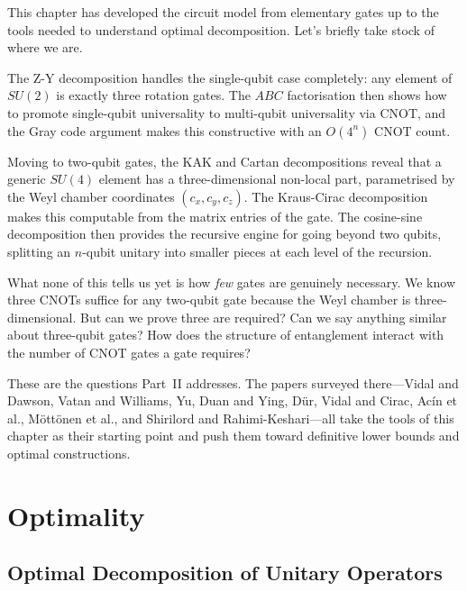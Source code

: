 \documentclass[12pt, a4paper, oneside]{report}
\theoremstyle{plain}
\theoremstyle{definition}
\theoremstyle{remark}
\begin{document}
This chapter has developed the circuit model from elementary gates up to the tools needed to
understand optimal decomposition. Let's briefly take stock of where we are.

The Z-Y decomposition handles the single-qubit case completely: any element of $SU(2)$ is
exactly three rotation gates. The $ABC$ factorisation then shows how to promote single-qubit
universality to multi-qubit universality via CNOT, and the Gray code argument makes this
constructive with an $O(4^n)$ CNOT count.

Moving to two-qubit gates, the KAK and Cartan decompositions reveal that a generic
$SU(4)$ element has a three-dimensional non-local part, parametrised by the Weyl chamber
coordinates $(c_x, c_y, c_z)$. The Kraus-Cirac decomposition makes this computable from the
matrix entries of the gate. The cosine-sine decomposition then provides the recursive engine
for going beyond two qubits, splitting an $n$-qubit unitary into smaller pieces at each
level of the recursion.

What none of this tells us yet is how \emph{few} gates are genuinely necessary. We know
three CNOTs suffice for any two-qubit gate because the Weyl chamber is three-dimensional.
But can we prove three are required? Can we say anything similar about three-qubit gates?
How does the structure of entanglement interact with the number of CNOT gates a gate requires?

These are the questions Part~II addresses. The papers surveyed there---Vidal and Dawson,
Vatan and Williams, Yu, Duan and Ying, Dür, Vidal and Cirac, Acín et al., Möttönen et al.,
and Shirilord and Rahimi-Keshari---all take the tools of this chapter as their starting
point and push them toward definitive lower bounds and optimal constructions.

\part{Optimality}

\chapter{Optimal Decomposition of Unitary Operators}
\label{ch:optimality}
\end{document}
